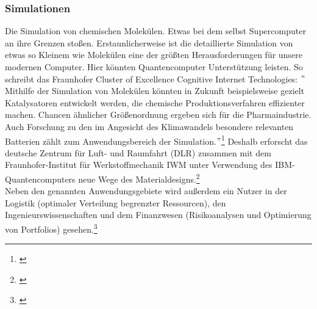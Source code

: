 \subsubsection{Simulationen}
\label{subsubsec:simulationen}
Die Simulation von chemischen Molekülen.
Etwas bei dem selbst Supercomputer an ihre Grenzen stoßen.
Erstaunlicherweise ist die detaillierte Simulation von etwas so Kleinem wie Molekülen eine der größten Herausforderungen für unsere modernen Computer.
Hier könnten Quantencomputer Unterstützung leisten.
So schreibt das Fraunhofer Cluster of Excellence Cognitive Internet Technologies:
\("\) Mithilfe der Simulation von Molekülen könnten in Zukunft beispielsweise gezielt Katalysatoren entwickelt werden, die chemische Produktionsverfahren effizienter machen.
Chancen ähnlicher Größenordnung ergeben sich für die Pharmaindustrie.
Auch Forschung zu den im Angesicht des Klimawandels besondere relevanten Batterien zählt zum Anwendungsbereich der Simulation.\("\)\footnote{\cite{Fraunhofer_quantencomputing_2025}}
Deshalb erforscht das deutsche Zentrum für Luft- und Raumfahrt (DLR) zusammen mit dem Fraunhofer-Institut für Werkstoffmechanik IWM unter Verwendung des IBM-Quantencomputers neue Wege des Materialdesigns.\footnote{\cite{FraunhoferIWM_quantencomputer_2025}}\\

Neben den genannten Anwendungsgebiete wird außerdem ein Nutzer in der Logistik (optimaler Verteilung begrenzter Ressourcen), den Ingenieurswissenschaften und dem Finanzwesen (Risikoanalysen und Optimierung von Portfolios) gesehen.\footnote{\cite{Fraunhofer_quantencomputing_2025}}\\








